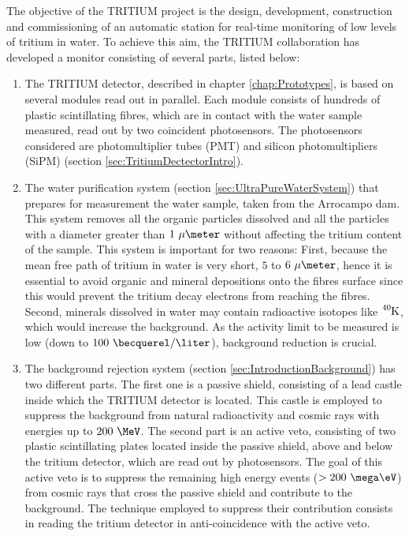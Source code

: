 The objective of the TRITIUM project is the design, development, construction and commissioning of an automatic station for real-time monitoring of low levels of tritium in water. To achieve this aim, the TRITIUM collaboration has developed a monitor consisting of several parts, listed below: 

\begin{enumerate}

\item{} The TRITIUM detector, described in chapter \ref{chap:Prototypes}, is based on several modules read out in parallel. Each module consists of hundreds of plastic scintillating fibres, which are in contact with the water sample measured, read out by two coincident photosensors. The photosensors considered are photomultiplier tubes (PMT) and silicon photomultipliers (SiPM) (section \ref{sec:TritiumDectectorIntro}).

\item{} The water purification system (section \ref{sec:UltraPureWaterSystem}) that prepares for measurement the water sample, taken from the Arrocampo dam. This system removes all the organic particles dissolved and all the particles with a diameter greater than $1~\mu\meter$ without affecting the tritium content of the sample. This system is important for two reasons: First, because the mean free path of tritium in water is very short, $5$ to $6~\mu\meter$,  hence it is essential to avoid organic and mineral depositions onto the fibres surface since this would prevent the tritium decay electrons from reaching the fibres. Second, minerals dissolved in water may contain radioactive isotopes like $\ce{^{40}K}$, which would increase the background. As the activity limit to be measured is low (down to $100~\becquerel/\liter$), background reduction is crucial.

\item{} The background rejection system (section \ref{sec:IntroductionBackground}) has two different parts. The first one is a passive shield, consisting of a lead castle inside which the TRITIUM detector is located. This castle is employed to suppress the background from natural radioactivity and cosmic rays with energies up to $200~\MeV$. The second part is an active veto, consisting of two plastic scintillating plates located inside the passive shield, above and below the tritium detector, which are read out by photosensors. The goal of this active veto is to suppress the remaining high energy events ($>200~\mega\eV$) from cosmic rays that cross the passive shield and contribute to the background. The technique employed to suppress their contribution consists in reading the tritium detector in anti-coincidence with the active veto.


\end{enumerate}
